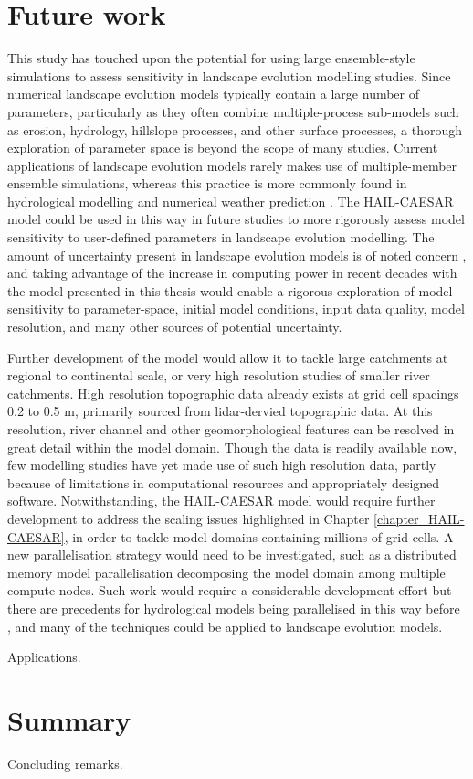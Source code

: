 \section{Future work}
This study has touched upon the potential for using large ensemble-style simulations to assess sensitivity in landscape evolution modelling studies. Since numerical landscape evolution models typically contain a large number of parameters, particularly as they often combine multiple-process sub-models such as erosion, hydrology, hillslope processes, and other surface processes, a thorough exploration of parameter space is beyond the scope of many studies. Current applications of landscape evolution models rarely makes use of multiple-member ensemble simulations, whereas this practice is more commonly found in hydrological modelling \citep{cloke2009ensemble,wong2015sensitivity} and numerical weather prediction \citep{sivillo1997ensemble}. The HAIL-CAESAR model could be used in this way in future studies to more rigorously assess model sensitivity to user-defined parameters in landscape evolution modelling. The amount of uncertainty present in landscape evolution models is of noted concern \citep{pelletier2015forecasting}, and taking advantage of the increase in computing power in recent decades with the model presented in this thesis would enable a rigorous exploration of model sensitivity to parameter-space, initial model conditions, input data quality, model resolution, and many other sources of potential uncertainty.

Further development of the model would allow it to tackle large catchments at regional to continental scale, or very high resolution studies of smaller river catchments. High resolution topographic data already exists at grid cell spacings 0.2 to 0.5 m, primarily sourced from lidar-dervied topographic data. At this resolution, river channel and other geomorphological features can be resolved in great detail within the model domain. Though the data is readily available now, few modelling studies have yet made use of such high resolution data, partly because of limitations in computational resources and appropriately designed software. Notwithstanding, the HAIL-CAESAR model would require further development to address the scaling issues highlighted in Chapter \ref{chapter_HAIL-CAESAR}, in order to tackle model domains containing millions of grid cells. A new parallelisation strategy would need to be investigated, such as a distributed memory model parallelisation decomposing the model domain among multiple compute nodes. Such work would require a considerable development effort but there are precedents for hydrological models being parallelised in this way before \citep{vivoni2011real}, and many of the techniques could be applied to landscape evolution models. 


Applications.

\section{Summary}
Concluding remarks.
